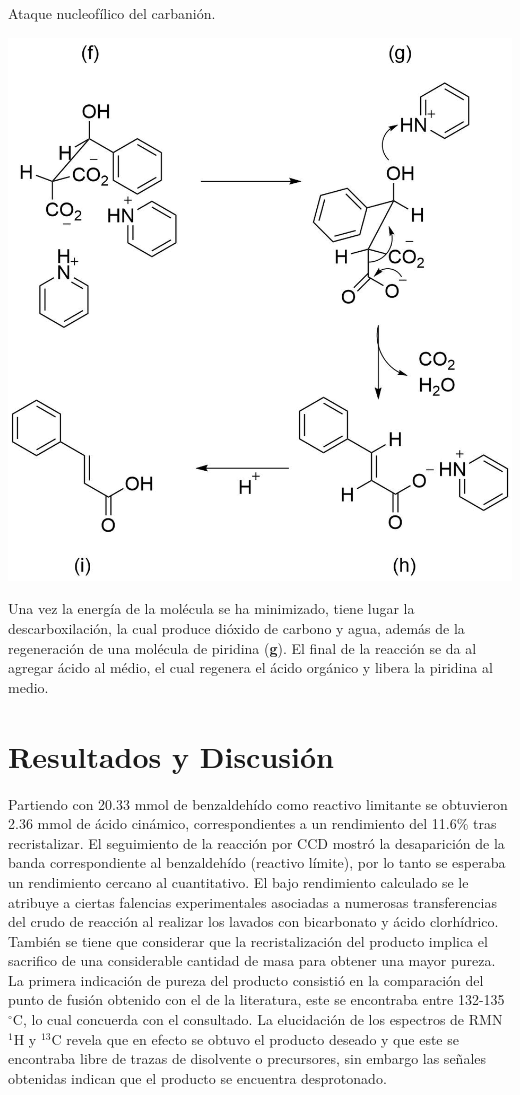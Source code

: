 \documentclass[fleqn,11pt]{SelfArx}
\begin{document}
\begin{scheme}[h]
	\centering
	\caption{Ataque nucleofílico del carbanión.}
	\includegraphics[width=0.9\linewidth]{structures/mechanism3.png}
	\label{sch: mechanism3}
\end{scheme}

Una vez la energía de la molécula se ha minimizado, tiene lugar la descarboxilación, la cual produce dióxido de carbono y agua, además de la regeneración de una molécula de piridina (\textbf{g}). El final de la reacción se da al agregar ácido al médio, el cual regenera el ácido orgánico y libera la piridina al medio.


\section{Resultados y Discusi\'on}
Partiendo con 20.33 mmol de benzaldehído como reactivo limitante se obtuvieron 2.36 mmol de ácido cinámico, correspondientes a un rendimiento del 11.6\% tras recristalizar. El seguimiento de la reacción por CCD mostró la desaparición de la banda correspondiente al benzaldehído (reactivo límite), por lo tanto se esperaba un rendimiento cercano al cuantitativo. El bajo rendimiento calculado se le atribuye a ciertas falencias experimentales asociadas a numerosas transferencias del crudo de reacción al realizar los lavados con bicarbonato y ácido clorhídrico. También se tiene que considerar que la recristalización del producto implica el sacrifico de una considerable cantidad de masa para obtener una mayor pureza. La primera indicación de pureza del producto consistió en la comparación del punto de fusión obtenido con el de la literatura, este se encontraba entre 132-135 $^\circ$C, lo cual concuerda con el consultado. La elucidación de los espectros de RMN $^1$H y $^{13}$C revela que en efecto se obtuvo el producto deseado y que este se encontraba libre de trazas de disolvente o precursores, sin embargo las señales obtenidas indican que el producto se encuentra desprotonado.
\end{document}
